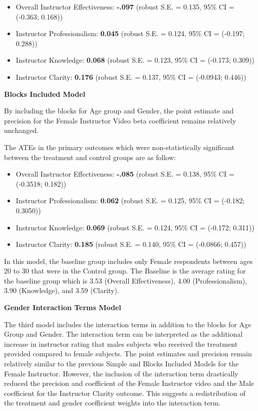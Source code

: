 \documentclass[
]{article}
\providecommand{\tightlist}{%
  \setlength{\itemsep}{0pt}\setlength{\parskip}{0pt}}
\begin{document}
\begin{itemize}
\tightlist
\item
  Overall Instructor Effectiveness: \textbf{-.097} (robust S.E. = 0.135,
  95\% CI = (-0.363; 0.168))
\item
  Instructor Professionalism: \textbf{0.045} (robust S.E. = 0.124, 95\%
  CI = (-0.197; 0.288))
\item
  Instructor Knowledge: \textbf{0.068} (robust S.E. = 0.123, 95\% CI =
  (-0.173; 0.309))
\item
  Instructor Clarity: \textbf{0.176} (robust S.E. = 0.137, 95\% CI =
  (-0.0943; 0.446))
\end{itemize}

\textbf{Blocks Included Model}

By including the blocks for Age group and Gender, the point estimate and
precision for the Female Instructor Video beta coefficient remains
relatively unchanged.

The ATEs in the primary outcomes which were non-statistically
significant between the treatment and control groups are as follow:

\begin{itemize}
\tightlist
\item
  Overall Instructor Effectiveness: \textbf{-.085} (robust S.E. = 0.138,
  95\% CI = (-0.3518; 0.182))
\item
  Instructor Professionalism: \textbf{0.062} (robust S.E. = 0.125, 95\%
  CI = (-0.182; 0.3050))
\item
  Instructor Knowledge: \textbf{0.069} (robust S.E. = 0.124, 95\% CI =
  (-0.172; 0.311))
\item
  Instructor Clarity: \textbf{0.185} (robust S.E. = 0.140, 95\% CI =
  (-0.0866; 0.457))
\end{itemize}

In this model, the baseline group includes only Female respondents
between ages 20 to 30 that were in the Control group. The Baseline is
the average rating for the baseline group which is 3.53 (Overall
Effectiveness), 4.00 (Professionalism), 3.90 (Knowledge), and 3.59
(Clarity).

\textbf{Gender Interaction Terms Model}

The third model includes the interaction terms in addition to the blocks
for Age Group and Gender. The interaction term can be interpreted as the
additional increase in instructor rating that males subjects who
received the treatment provided compared to female subjects. The point
estimates and precision remain relatively similar to the previous Simple
and Blocks Included Models for the Female Instructor. However, the
inclusion of the interaction term drastically reduced the precision and
coefficient of the Female Instructor video and the Male coefficient for
the Instructor Clarity outcome. This suggests a redistribution of the
treatment and gender coefficient weights into the interaction term.
\end{document}
